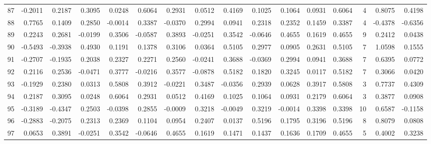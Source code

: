 \begin{tabular}{lrrrrrrrrrrrrrrr}
87  &     -0.2011 &  0.2187 &  0.3095 &  0.0248 &  0.6064 &  0.2931 &  0.0512 &  0.4169 &  0.1025 &  0.1064 &   0.0931 &     0.6064 &      4 &                    0.8075 &                     0.4198 \\
88  &      0.7765 &  0.1409 &  0.2850 & -0.0014 &  0.3387 & -0.0370 &  0.2994 &  0.0941 &  0.2318 &  0.2352 &   0.1459 &     0.3387 &      4 &                   -0.4378 &                    -0.6356 \\
89  &      0.2243 &  0.2681 & -0.0199 &  0.3506 & -0.0587 &  0.3893 & -0.0251 &  0.3542 & -0.0646 &  0.4655 &   0.1619 &     0.4655 &      9 &                    0.2412 &                     0.0438 \\
90  &     -0.5493 & -0.3938 &  0.4930 &  0.1191 &  0.1378 &  0.3106 &  0.0364 &  0.5105 &  0.2977 &  0.0905 &   0.2631 &     0.5105 &      7 &                    1.0598 &                     0.1555 \\
91  &     -0.2707 & -0.1935 &  0.2038 &  0.2327 &  0.2271 &  0.2560 & -0.0241 &  0.3688 & -0.0369 &  0.2994 &   0.0941 &     0.3688 &      7 &                    0.6395 &                     0.0772 \\
92  &      0.2116 &  0.2536 & -0.0471 &  0.3777 & -0.0216 &  0.3577 & -0.0878 &  0.5182 &  0.1820 &  0.3245 &   0.0117 &     0.5182 &      7 &                    0.3066 &                     0.0420 \\
93  &     -0.1929 &  0.2380 &  0.0313 &  0.5808 &  0.3912 & -0.0221 &  0.3487 & -0.0356 &  0.2939 &  0.0628 &   0.3917 &     0.5808 &      3 &                    0.7737 &                     0.4309 \\
94  &      0.2187 &  0.3095 &  0.0248 &  0.6064 &  0.2931 &  0.0512 &  0.4169 &  0.1025 &  0.1064 &  0.0931 &   0.2179 &     0.6064 &      3 &                    0.3877 &                     0.0908 \\
95  &     -0.3189 & -0.4347 &  0.2503 & -0.0398 &  0.2855 & -0.0009 &  0.3218 & -0.0049 &  0.3219 & -0.0014 &   0.3398 &     0.3398 &     10 &                    0.6587 &                    -0.1158 \\
96  &     -0.2883 & -0.2075 &  0.2313 &  0.2369 &  0.1104 &  0.0954 &  0.2407 &  0.0137 &  0.5196 &  0.1795 &   0.3196 &     0.5196 &      8 &                    0.8079 &                     0.0808 \\
97  &      0.0653 &  0.3891 & -0.0251 &  0.3542 & -0.0646 &  0.4655 &  0.1619 &  0.1471 &  0.1437 &  0.1636 &   0.1709 &     0.4655 &      5 &                    0.4002 &                     0.3238 \\

\end{tabular}
